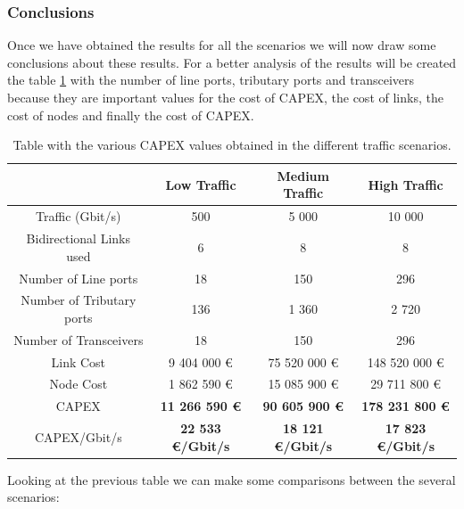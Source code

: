 \vspace{13pt}
\subsubsection{Conclusions}

Once we have obtained the results for all the scenarios we will now draw some conclusions about these results. For a better analysis of the results will be created the table \ref{table_comparative_opaque_surv} with the number of line ports, tributary ports and transceivers because they are important values for the cost of CAPEX, the cost of links, the cost of nodes and finally the cost of CAPEX.\\

\begin{table}[h!]
\centering
\begin{tabular}{| c | c | c | c |}
 \hline
  & Low Traffic & Medium Traffic  & High Traffic \\
 \hline\hline
 Traffic (Gbit/s) & 500 & 5 000 & 10 000 \\ \hline
 Bidirectional Links used & 6 & 8 & 8 \\ \hline
 Number of Line ports & 18 & 150 & 296 \\ \hline
 Number of Tributary ports & 136 & 1 360 & 2 720 \\ \hline
 Number of Transceivers & 18 & 150 & 296 \\ \hline
 Link Cost & 9 404 000 \euro & 75 520 000 \euro & 148 520 000 \euro \\ \hline
 Node Cost & 1 862 590 \euro & 15 085 900 \euro & 29 711 800 \euro \\ \hline
 CAPEX & \textbf{11 266 590 \euro} & \textbf{90 605 900 \euro} & \textbf{178 231 800 \euro} \\ \hline
 CAPEX/Gbit/s & \textbf{22 533 \euro/Gbit/s} & \textbf{18 121 \euro/Gbit/s} & \textbf{17 823 \euro/Gbit/s}\\
 \hline
\end{tabular}
\caption{Table with the various CAPEX values obtained in the different traffic scenarios.}
\label{table_comparative_opaque_surv}
\end{table}

\newpage
Looking at the previous table we can make some comparisons between the several scenarios:

